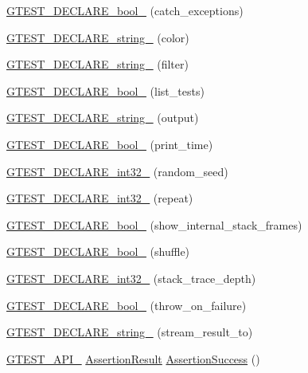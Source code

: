 \begin{DoxyCompactItemize}
\hyperlink{namespacetesting_ab6f1777f7b740f31e41f7da017447b58}{G\+T\+E\+S\+T\+\_\+\+D\+E\+C\+L\+A\+R\+E\+\_\+bool\+\_\+} (catch\+\_\+exceptions)
\item 
\hyperlink{namespacetesting_a0f658c915a1e60996a2ab00a06612723}{G\+T\+E\+S\+T\+\_\+\+D\+E\+C\+L\+A\+R\+E\+\_\+string\+\_\+} (color)
\item 
\hyperlink{namespacetesting_a20d69860ce843142c7f740262e6b0c9a}{G\+T\+E\+S\+T\+\_\+\+D\+E\+C\+L\+A\+R\+E\+\_\+string\+\_\+} (filter)
\item 
\hyperlink{namespacetesting_af2cd3595c571ca408afc337bc4bb2619}{G\+T\+E\+S\+T\+\_\+\+D\+E\+C\+L\+A\+R\+E\+\_\+bool\+\_\+} (list\+\_\+tests)
\item 
\hyperlink{namespacetesting_a3fe54dd551f1c36cfdd1b36cd6881a44}{G\+T\+E\+S\+T\+\_\+\+D\+E\+C\+L\+A\+R\+E\+\_\+string\+\_\+} (output)
\item 
\hyperlink{namespacetesting_aeccefd463a0942da24750e1bbee76041}{G\+T\+E\+S\+T\+\_\+\+D\+E\+C\+L\+A\+R\+E\+\_\+bool\+\_\+} (print\+\_\+time)
\item 
\hyperlink{namespacetesting_ae754999b59509808254d39e3a3cf38e0}{G\+T\+E\+S\+T\+\_\+\+D\+E\+C\+L\+A\+R\+E\+\_\+int32\+\_\+} (random\+\_\+seed)
\item 
\hyperlink{namespacetesting_a315ef0647e4f2795bf1705de8e9c9659}{G\+T\+E\+S\+T\+\_\+\+D\+E\+C\+L\+A\+R\+E\+\_\+int32\+\_\+} (repeat)
\item 
\hyperlink{namespacetesting_af37b9206b938bb8b7d398a1379eb7482}{G\+T\+E\+S\+T\+\_\+\+D\+E\+C\+L\+A\+R\+E\+\_\+bool\+\_\+} (show\+\_\+internal\+\_\+stack\+\_\+frames)
\item 
\hyperlink{namespacetesting_a6d87f7374e105483905a305328856f4b}{G\+T\+E\+S\+T\+\_\+\+D\+E\+C\+L\+A\+R\+E\+\_\+bool\+\_\+} (shuffle)
\item 
\hyperlink{namespacetesting_adba6f8afa0f8695956d0134f1629a10b}{G\+T\+E\+S\+T\+\_\+\+D\+E\+C\+L\+A\+R\+E\+\_\+int32\+\_\+} (stack\+\_\+trace\+\_\+depth)
\item 
\hyperlink{namespacetesting_ac69f2aeeb84dc5f49bd3d040a6f32d17}{G\+T\+E\+S\+T\+\_\+\+D\+E\+C\+L\+A\+R\+E\+\_\+bool\+\_\+} (throw\+\_\+on\+\_\+failure)
\item 
\hyperlink{namespacetesting_ad4d1ea63037fc21018dbe997cb0041d1}{G\+T\+E\+S\+T\+\_\+\+D\+E\+C\+L\+A\+R\+E\+\_\+string\+\_\+} (stream\+\_\+result\+\_\+to)
\item 
\hyperlink{gtest-port_8h_aa73be6f0ba4a7456180a94904ce17790}{G\+T\+E\+S\+T\+\_\+\+A\+P\+I\+\_\+} \hyperlink{classtesting_1_1AssertionResult}{Assertion\+Result} \hyperlink{namespacetesting_ac1d0baedb17286c5c6c87bd1a45da8ac}{Assertion\+Success} ()

\end{DoxyCompactItemize}
